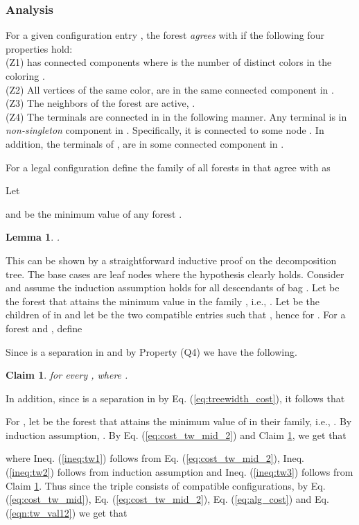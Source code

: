 \documentclass[12pt]{article}
\newtheorem{lemma}[theorem]{Lemma}
\newtheorem{claim}{Claim}[section]
\def\Proof{\par\noindent{\bf Proof:~}}
\begin{document}
\subsubsection{Analysis}
For a given configuration entry , the forest  \emph{agrees} with  if the following four properties hold:\\
(Z1)  has  connected components where   is the number of distinct colors in the coloring . \\
(Z2) All vertices  of the same color,  are in the same connected component in .\\
(Z3) The  neighbors of the forest are active, .\\
(Z4) The terminals  are connected in  in the following manner.
Any terminal  is in \emph{non-singleton} component in . Specifically, it is connected to some node . In addition, the terminals of , are in some connected component in .
\par For a legal configuration  define the family of all forests in  that agree with  as

Let

and  be the minimum value of any forest .
\begin{lemma}
\label{lem:cor}
.
\end{lemma}
\Proof
This can be shown by a straightforward inductive proof on the decomposition tree. The base cases are leaf nodes where the hypothesis clearly holds. Consider  and assume the induction assumption holds for all descendants of bag .
Let  be the forest that attains the minimum value in the family , i.e., .
Let  be the children of  in  and let  be the two compatible entries such that , hence  for .
For a forest  and , define


Since  is a separation in  and by Property (Q4) we have the following.

\begin{claim}
\label{cl:tw1}
 for every , where .
\end{claim}

In addition, since  is a separation in  by Eq. (\ref{eq:treewidth_cost}), it follows that

For , let  be the forest that attains the minimum value of  in their family, i.e.,
.
By induction assumption, .
By Eq. (\ref{eq:cost_tw_mid_2}) and Claim \ref{cl:tw1}, we get that

where Ineq. (\ref{ineq:tw1}) follows from Eq. (\ref{eq:cost_tw_mid_2}),
Ineq. (\ref{ineq:tw2}) follows from induction assumption and
Ineq. (\ref{ineq:tw3}) follows from Claim \ref{cl:tw1}.
Thus since the triple  consists of compatible configurations, by Eq.  (\ref{eq:cost_tw_mid}), Eq. (\ref{eq:cost_tw_mid_2}), Eq. (\ref{eq:alg_cost}) and Eq. (\ref{eqn:tw_val12})
we get that
\end{document}

